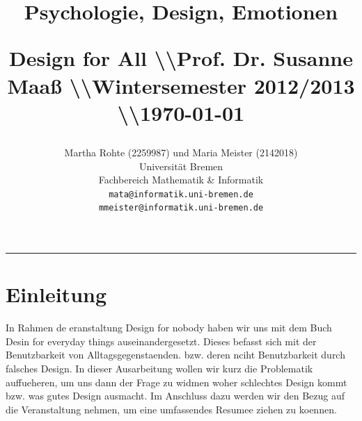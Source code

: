 \documentclass[parskip,headsepline, headtopline, %
footsepline, oneside, 12pt, headings=small]{scrreprt}
\title{ \fontsize{50}{60}\selectfont \vspace{2.10cm}
\hfill \begin{huge}{\fontfamily{@arialn}\selectfont {\fontfamily{txtt}\selectfont The Design for All}}\end{huge}
 \hfill \large{\begin{flushright}Psychologie, Design, Emotionen\end{flushright}} \vspace{1.9cm}
 \hfill \small{Design for All \textbackslash\textbackslash Prof. Dr. Susanne Maaß \textbackslash\textbackslash  Wintersemester 2012/2013 \textbackslash\textbackslash  \today} 
}
\author{
                \hfill Martha Rohte (2259987) und Maria Meister (2142018)\\  
                \hfill Universität Bremen\\   
                \hfill Fachbereich Mathematik \& Informatik \\
        \hfill \texttt{\fontfamily{cmr}\selectfont mata@informatik.uni-bremen.de} \\
        \hfill \texttt{\fontfamily{cmr}\selectfont mmeister@informatik.uni-bremen.de} \\
}
\makeatletter
\newcommand{\HRule}[1]{\hfill \rule{0.2\linewidth}{#1}}         %
\def\printtitle{%
    {\centering \@title\par}}
\def\printauthor{%
    {\centering \large \@author}}
\makeatother
\begin{document}
\thispagestyle{empty}                           %



\colorbox{grey}{
        \parbox[t]{1.14\linewidth}{
                \printtitle 
                \vspace*{0.2cm}               
        }
}
        \vfill
\printauthor                                                            %
\HRule{1pt}

\clearpage




\tableofcontents
 \clearpage

\chapter*{Einleitung}


In Rahmen de eranstaltung Design for nobody haben wir uns mit dem Buch Desin for everyday things auseinandergesetzt. Dieses befasst sich mit der  Benutzbarkeit von Alltagsgegenstaenden. bzw. deren nciht Benutzbarkeit durch falsches Design. In dieser Ausarbeitung wollen wir kurz die Problematik auffueheren,  um uns dann der Frage zu widmen woher schlechtes Design kommt bzw. was gutes Design ausmacht. Im Anschluss dazu werden wir den Bezug auf die Veranstaltung nehmen, um eine umfassendes Resumee ziehen zu koennen.
\end{document}
